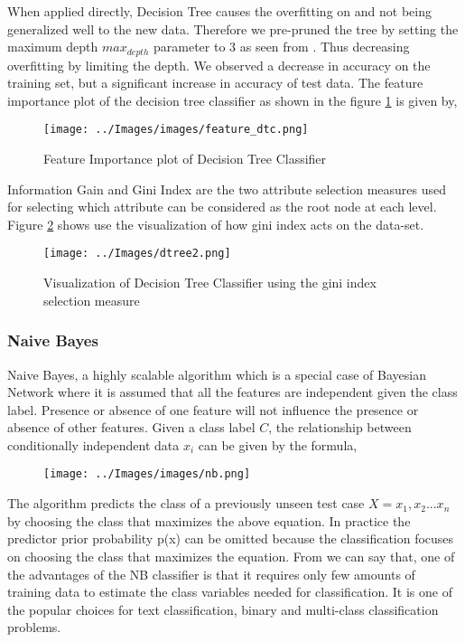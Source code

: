 \documentclass[conference]{IEEEtran}
\begin{document}
When applied directly, Decision Tree causes the overfitting on \cite{monoclonal1} and not being generalized well to the new data. Therefore we pre-pruned the tree by setting the maximum depth $max_{depth}$ parameter to 3 as seen from \cite{dt}. Thus decreasing overfitting by limiting the depth. We observed a decrease in accuracy on the training set, but a significant increase in accuracy of test data. The feature importance plot of the decision tree classifier as shown in the figure \ref{feature_dtc} is given by,

\begin{figure}[h!]
	\centering
	\texttt{[image: ../Images/images/feature\_dtc.png]}
	\caption{Feature Importance plot of Decision Tree Classifier}
	\label{feature_dtc}
\end{figure}
Information Gain and Gini Index are the two attribute selection measures used for selecting which attribute can be considered as the root node at each level. Figure \ref{gini} shows use the visualization of how gini index acts on the data-set.

\begin{figure*}[h!]
	\centering
	\texttt{[image: ../Images/dtree2.png]}
	\caption{Visualization of Decision Tree Classifier using the gini index selection measure}
	\label{gini}
\end{figure*}

\subsubsection*{Naive Bayes}
Naive Bayes, a highly scalable algorithm which is a special case of Bayesian Network where it is assumed that all the features are independent given the class label. Presence or absence of one feature will not influence the presence or absence of other features. Given a class label $C$, the relationship between conditionally independent data $x_i$ can be given by the formula,
\begin{figure}[H]
	\centering
	\texttt{[image: ../Images/images/nb.png]}
	\label{fig:nb}
\end{figure}
\par
The algorithm predicts the class of a previously unseen test case $X={x_1, x_2... x_n}$ by choosing the class that maximizes the above equation. In practice the predictor prior probability p(x) can be omitted because the classification focuses on choosing the class that maximizes the equation. From \cite{nb} we can say that, one of the advantages of the NB classifier is that it requires only few amounts of training data to estimate the class variables needed for classification. It is one of the popular choices for text classification, binary and multi-class classification problems.
\end{document}
